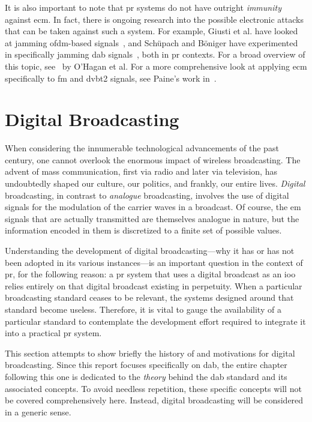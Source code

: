 \documentclass[class=report,11pt,crop=false]{standalone}
\begin{document}
It is also important to note that \gls{pr} systems do not have outright \emph{immunity} against \gls{ecm}. In fact, there is ongoing research into the possible electronic attacks that can be taken against such a system. For example, Giusti et al. have looked at jamming \gls{ofdm}-based signals~\cite{Giusti2018}, and Sch\"upach and B\"oniger have experimented in specifically jamming \gls{dab} signals~\cite{schupbach2016}, both in \gls{pr} contexts. For a broad overview of this topic, see~\cite{OHagan2019} by O'Hagan et al. For a more comprehensive look at applying \gls{ecm} specifically to \gls{fm} and \gls{dvbt2} signals, see Paine's work in~\cite{painePHD2019}.

\section{Digital Broadcasting}
When considering the innumerable technological advancements of the past century, one cannot overlook the enormous impact of wireless broadcasting. The advent of mass communication, first via radio and later via television, has undoubtedly shaped our culture, our politics, and frankly, our entire lives. \emph{Digital} broadcasting, in contrast to \emph{analogue} broadcasting, involves the use of digital signals for the modulation of the carrier waves in a broadcast. Of course, the \gls{em} signals that are actually transmitted are themselves analogue in nature, but the information encoded in them is discretized to a finite set of possible values.

Understanding the development of digital broadcasting---why it has or has not been adopted in its various instances---is an important question in the context of \gls{pr}, for the following reason: a \gls{pr} system that uses a digital broadcast as an \gls{ioo} relies entirely on that digital broadcast existing in perpetuity. When a particular broadcasting standard ceases to be relevant, the systems designed around that standard become useless. Therefore, it is vital to gauge the availability of a particular standard to contemplate the development effort required to integrate it into a practical \gls{pr} system.

This section attempts to show briefly the history of and motivations for digital broadcasting. Since this report focuses specifically on \gls{dab}, the entire chapter following this one is dedicated to the \emph{theory} behind the \gls{dab} standard and its associated concepts. To avoid needless repetition, these specific concepts will not be covered comprehensively here. Instead, digital broadcasting will be considered in a generic sense.
\end{document}
